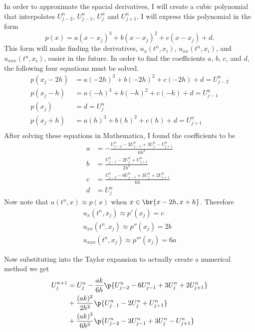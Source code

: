 \documentclass[11pt, oneside, titlepage]{article}
\begin{document}
\begin{enumerate}
\begin{enumerate}
                In order to approximate the spacial derivatives, I will create
                a cubic polynomial that interpolates $U_{j-2}^n$, $U_{j-1}^n$,
                $U_j^n$ and $U_{j+1}^n$.
                I will express this polynomial in the form
                \[
                    p(x) = a(x - x_j)^3 + b(x - x_j)^2 + c(x - x_j) + d.
                \]
                This form will make finding the derivatives, $u_x(t^n, x_i)$,
                $u_{xx}(t^n, x_i)$, and $u_{xxx}(t^n, x_i)$, easier in the
                future.
                In order to find the coefficients $a$, $b$, $c$, and $d$, the
                following four equations must be solved.
                \begin{align*}
                    p(x_j - 2h) &= a(-2h)^3 + b(-2h)^2 + c(-2h) + d = U_{j-2}^n \\
                    p(x_j - h) &= a(-h)^3 + b(-h)^2 + c(-h) + d = U_{j-1}^n \\
                    p(x_j) &= d = U_{j}^n \\
                    p(x_j + h) &= a(h)^3 + b(h)^2 + c(h) + d = U_{j+1}^n \\
                \end{align*}
                After solving these equations in Mathematica, I found the
                coefficients to be
                \begin{align*}
                    a &= -\frac{U_{j-2}^n - 3U_{j-1}^n + 3U_j^n - U_{j+1}^n}{6h^3}\\
                    b &= \frac{U_{j-1}^n - 2U_j^n + U_{j+1}^n}{2h^2}\\
                    c &= \frac{U_{j-2}^n - 6U_{j-1}^n + 3U_j^n + 2U_{j+1}^n}{6h} \\
                    d &= U_j^n
                \end{align*}
                Now note that $u(t^n, x) \approx p(x)$ when $x \in \br{x-2h, x+h}$.
                Therefore
                \begin{align*}
                    u_x(t^n, x_j) \approx p'(x_j) = c \\
                    u_{xx}(t^n, x_j) \approx p''(x_j) = 2b \\
                    u_{xxx}(t^n, x_j) \approx p'''(x_j) = 6a
                \end{align*}

                Now substituting into the Taylor expansion to actually create a
                numerical method we get
                \begin{align*}
                    U_j^{n+1} &= U_j^n - \frac{ak}{6h} \p{U_{j-2}^n - 6U_{j-1}^n + 3U_j^n + 2U_{j+1}^n} \\
                        &+ \frac{(ak)^2}{2h^2} \p{U_{j-1}^n - 2U_j^n + U_{j+1}^n} \\
                        &+ \frac{(ak)^3}{6h^3} \p{U_{j-2}^n - 3U_{j-1}^n + 3U_j^n - U_{j+1}^n}
                \end{align*}


\end{enumerate}
\end{enumerate}
\end{document}
